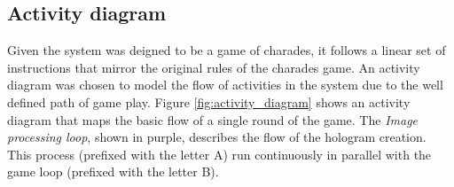 \subsection{Activity diagram}
\begin{figure}[h!]
\end{figure}
Given the system was deigned to be a game of charades, it follows a linear set of instructions that mirror the original rules of the charades game. An activity diagram was chosen to model the flow of activities in the system due to the well defined path of game play. Figure \ref{fig:activity_diagram} shows an activity diagram that maps the basic flow of a single round of the game. The \textit{Image processing loop}, shown in purple, describes the flow  of the hologram creation. This process (prefixed with the letter A) run continuously in parallel with the game loop (prefixed with the letter B).

